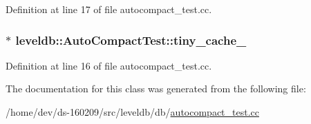 Definition at line 17 of file autocompact\+\_\+test.\+cc.

\hypertarget{classleveldb_1_1_auto_compact_test_a189cb5733d861b7df8c3bf945180afe5}{}
\subsubsection[{tiny\+\_\+cache\+\_\+}]{$\ast$ leveldb\+::\+Auto\+Compact\+Test\+::tiny\+\_\+cache\+\_\+}\label{classleveldb_1_1_auto_compact_test_a189cb5733d861b7df8c3bf945180afe5}


Definition at line 16 of file autocompact\+\_\+test.\+cc.



The documentation for this class was generated from the following file\+:\begin{DoxyCompactItemize}
\item 
/home/dev/ds-\/160209/src/leveldb/db/\hyperlink{autocompact__test_8cc}{autocompact\+\_\+test.\+cc}\end{DoxyCompactItemize}
